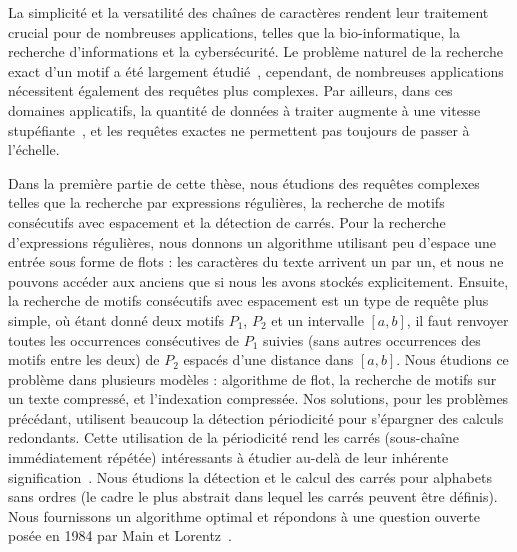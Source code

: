 La simplicité et la versatilité des chaînes de caractères rendent leur traitement crucial pour de nombreuses applications, telles que la bio-informatique, la recherche d'informations et la cybersécurité.
Le problème naturel de la recherche exact d'un motif a été largement étudié~\cite{charras2004handbook}, cependant, de nombreuses applications nécessitent également des requêtes plus complexes. Par ailleurs, dans ces domaines applicatifs, la quantité de données à traiter augmente à une vitesse stupéfiante~\cite{muir2016real}, et les requêtes exactes ne permettent pas toujours de passer à l'échelle.

Dans la première partie de cette thèse, nous étudions des requêtes complexes telles que la recherche par expressions régulières, la recherche de motifs consécutifs avec espacement et la détection de carrés.
Pour la recherche d'expressions régulières, nous donnons un algorithme utilisant peu d'espace une entrée sous forme de flots : les caractères du texte arrivent un par un, et nous ne pouvons accéder aux anciens que si nous les avons stockés explicitement.
Ensuite, la recherche de motifs consécutifs avec espacement est un type de requête plus simple, où étant donné deux motifs $P_1$, $P_2$ et un intervalle $[a, b]$, il faut renvoyer toutes les occurrences consécutives de $P_1$ suivies (sans autres occurrences des motifs entre les deux) de $P_2$ espacés d'une distance dans $[a, b]$. Nous étudions ce problème dans plusieurs modèles : algorithme de flot, la recherche de motifs sur un texte compressé, et l'indexation compressée.
Nos solutions, pour les problèmes précédant, utilisent beaucoup la détection périodicité pour s'épargner des calculs redondants. Cette utilisation de la périodicité rend les carrés (sous-chaîne immédiatement répétée) intéressants à étudier au-delà de leur inhérente signification~\cite{Kolpakov2003}. Nous étudions la détection et le calcul des carrés pour alphabets sans ordres (le cadre le plus abstrait dans lequel les carrés peuvent être définis). Nous fournissons un algorithme optimal et répondons à une question ouverte posée en 1984 par Main et Lorentz~\cite{Main1984}.

